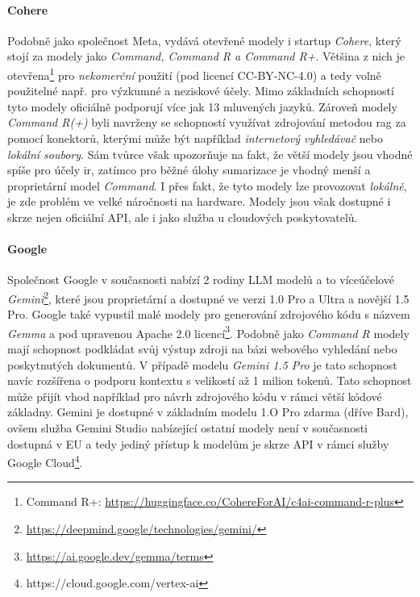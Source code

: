 \documentclass[czech, ma, kiv, he, iso690numb, pdf, viewonly]{fasthesis}
\begin{document}
    \paragraph{Cohere} Podobně jako společnost Meta, vydává otevřené modely i startup \textit{Cohere}, který stojí za modely jako \textit{Command, Command R a Command R+}. Většina z nich je otevřena\footnote{Command R+: \url{https://huggingface.co/CohereForAI/c4ai-command-r-plus}} pro \emph{nekomerční} použití (pod licencí CC-BY-NC-4.0) a tedy volně použitelné např. pro výzkumné a neziskové účely. Mimo základních schopností tyto modely oficiálně podporují více jak 13 mluvených jazyků. Zároveň modely \textit{Command R(+)} byli navrženy se schopností využívat zdrojování metodou \Gls{rag} za pomocí konektorů, kterými může být například \textit{internetový vyhledávač} nebo \textit{lokální soubory}. Sám tvůrce však upozorňuje na fakt, že větší modely jsou vhodné spíše pro účely \Acrshort{ir}, zatímco pro běžné úlohy sumarizace je vhodný menší a proprietární model \textit{Command}. I přes fakt, že tyto modely lze provozovat \textit{lokálně}, je zde problém ve velké náročnosti na hardware. Modely jsou však dostupné i skrze nejen oficiální API, ale i jako služba u cloudových poskytovatelů. \cite{cohere_models} \cite{ruder_command_r}

    \paragraph{Google} Společnost Google v současnosti nabízí 2 rodiny LLM modelů a to víceúčelové \textit{Gemini}\footnote{\url{https://deepmind.google/technologies/gemini/}}, které jsou proprietární a dostupné ve verzi 1.0 Pro a Ultra a novější 1.5 Pro. Google také vypustil malé modely pro generování zdrojového kódu s názvem \textit{Gemma} a pod upravenou Apache 2.0 licencí\footnote{\url{https://ai.google.dev/gemma/terms}}. Podobně jako \textit{Command R} modely mají schopnost podkládat svůj výstup zdroji na bázi webového vyhledání nebo poskytnutých dokumentů. V případě modelu \textit{Gemini 1.5 Pro} je tato schopnost navíc rozšířena o podporu kontextu s velikostí až 1 milion tokenů. Tato schopnost může přijít vhod například pro návrh zdrojového kódu v rámci větší kódové základny. Gemini je dostupné v základním modelu 1.O Pro zdarma (dříve Bard), ovšem služba Gemini Studio nabízející ostatní modely není v současnosti dostupná v EU a tedy jediný přístup k modelům je skrze API v rámci služby Google Cloud\footnote{https://cloud.google.com/vertex-ai}.
\end{document}

